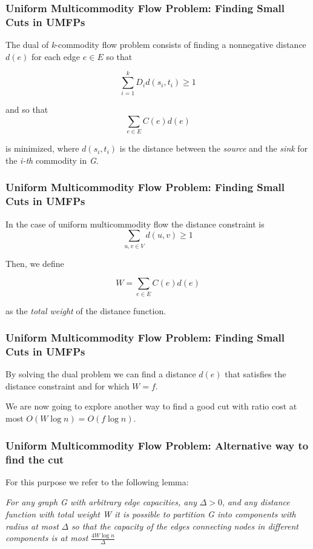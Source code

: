 \begin{frame}
\frametitle{Uniform Multicommodity Flow Problem: Finding Small Cuts in UMFPs}


The dual of \emph{k}-commodity flow problem consists of finding a nonnegative distance $d(e)$ for each edge $e \in E$ so that

$$\sum_{i=1}^{k}D_i d(s_i,t_i) \geq 1$$

and so that 
$$\sum_{e \in E} C(e)d(e)$$

is minimized, where $d(s_i,t_i)$ is the distance between the \emph{source} and the \emph{sink} for the \emph{i-th} commodity in \emph{G}.
\end{frame}

\begin{frame}
\frametitle{Uniform Multicommodity Flow Problem: Finding Small Cuts in UMFPs}

In the case of uniform multicommodity flow the distance constraint is
$$\sum_{u,v \in V}d(u,v) \geq 1$$

Then, we define 

$$W = \sum_{e \in E} C(e)d(e)$$

as the \emph{total weight} of the distance function.
\end{frame}

\begin{frame}
\frametitle{Uniform Multicommodity Flow Problem: Finding Small Cuts in UMFPs}

By solving the dual problem we can find a distance $d(e)$ that satisfies the distance constraint and for which $W=f$.

We are now going to explore another way to find a good cut with ratio cost at most $O(W\log n) = O(f\log n)$.
\end{frame}


\begin{frame}
\frametitle{Uniform Multicommodity Flow Problem: Alternative way to find the cut}

For this purpose we refer to the following lemma:

\emph{For any graph G with arbitrary edge capacities, any} $\Delta>0$, \emph{and any distance function with total weight W it is possible to partition G into components with radius at most} $\Delta$ \emph{so that the capacity of the edges connecting nodes in different components is at most} $\frac{4W\log n}{\Delta}$

\end{frame}

